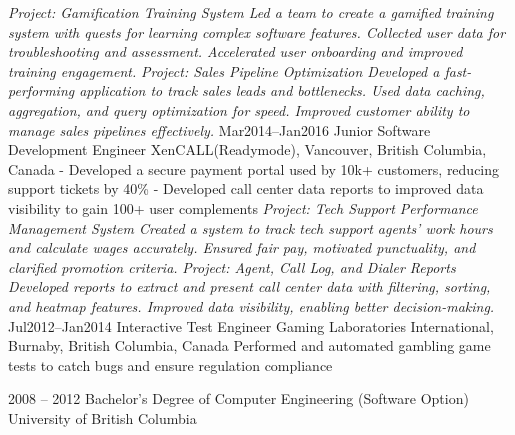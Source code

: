 \documentclass[9pt]{developercv} %
\begin{document}
\begin{entrylist}
{            \textit{Project: Gamification Training System\newline
            Led a team to create a gamified training system with quests for learning complex software features. 
            Collected user data for troubleshooting and assessment. 
            Accelerated user onboarding and improved training engagement. \newline\newline}
            \textit{Project: Sales Pipeline Optimization\newline
            Developed a fast-performing application to track sales leads and bottlenecks. 
            Used data caching, aggregation, and query optimization for speed. 
            Improved customer ability to manage sales pipelines effectively.\newline}
        }
	\entry
		{Mar2014--Jan2016}
		{Junior Software Development Engineer}
		{XenCALL(Readymode), Vancouver, British Columbia, Canada}
		{
            - Developed a secure payment portal used by 10k+ customers, reducing support tickets by 40\%\newline
            - Developed call center data reports to improved data visibility to gain 100+ user complements\newline
            \newline
            \textit{Project: Tech Support Performance Management System\newline
            Created a system to track tech support agents' work hours and calculate wages accurately. 
            Ensured fair pay, motivated punctuality, and clarified promotion criteria.
            \newline\newline}
            \textit{Project: Agent, Call Log, and Dialer Reports\newline
            Developed reports to extract and present call center data with filtering, sorting, and heatmap features. 
            Improved data visibility, enabling better decision-making.\newline}
        }
    \entry
		{Jul2012--Jan2014}
		{Interactive Test Engineer}
		{Gaming Laboratories International, Burnaby, British Columbia, Canada}
		{Performed and automated gambling game tests to catch bugs and ensure regulation compliance\newline}
\end{entrylist}



\begin{entrylist}
	\entry
		{2008 -- 2012}
		{Bachelor's Degree of Computer Engineering (Software Option)}
		{University of British Columbia}
		{}
\end{entrylist}
\end{document}
